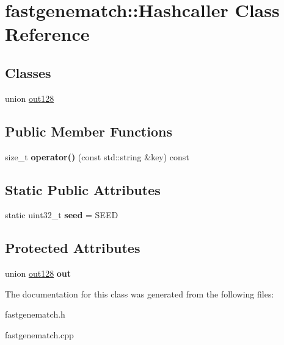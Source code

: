 \hypertarget{classfastgenematch_1_1Hashcaller}{
\section{fastgenematch::Hashcaller Class Reference}
\label{classfastgenematch_1_1Hashcaller}
}
\subsection*{Classes}
\begin{DoxyCompactItemize}
\item 
union \hyperlink{unionfastgenematch_1_1Hashcaller_1_1out128}{out128}
\end{DoxyCompactItemize}
\subsection*{Public Member Functions}
\begin{DoxyCompactItemize}
\item 
\hypertarget{classfastgenematch_1_1Hashcaller_adb7b8084b445f24f0fc412cb7de3566e}{
size\_\-t {\bfseries operator()} (const std::string \&key) const }
\label{classfastgenematch_1_1Hashcaller_adb7b8084b445f24f0fc412cb7de3566e}

\end{DoxyCompactItemize}
\subsection*{Static Public Attributes}
\begin{DoxyCompactItemize}
\item 
\hypertarget{classfastgenematch_1_1Hashcaller_af087bfe64d5b7cb0251a19071b26a21e}{
static uint32\_\-t {\bfseries seed} = SEED}
\label{classfastgenematch_1_1Hashcaller_af087bfe64d5b7cb0251a19071b26a21e}

\end{DoxyCompactItemize}
\subsection*{Protected Attributes}
\begin{DoxyCompactItemize}
\item 
\hypertarget{classfastgenematch_1_1Hashcaller_a243ace8edfd79fd39900fb34aafa593e}{
union \hyperlink{unionfastgenematch_1_1Hashcaller_1_1out128}{out128} {\bfseries out}}
\label{classfastgenematch_1_1Hashcaller_a243ace8edfd79fd39900fb34aafa593e}

\end{DoxyCompactItemize}


The documentation for this class was generated from the following files:\begin{DoxyCompactItemize}
\item 
fastgenematch.h\item 
fastgenematch.cpp\end{DoxyCompactItemize}
